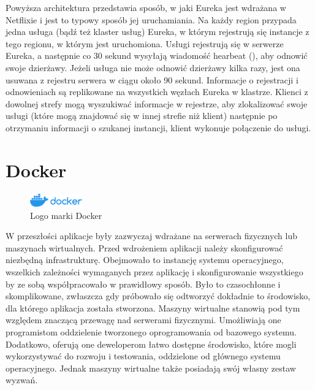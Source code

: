 Powyższa architektura przedstawia sposób, w jaki Eureka jest wdrażana w Netflixie i jest to typowy sposób jej uruchamiania. Na każdy region przypada jedna usługa (bądź też klaster usług) Eureka, w którym rejestrują się instancje z tego regionu, w którym jest uruchomiona. Usługi rejestrują się w serwerze Eureka, a następnie co 30 sekund wysyłają wiadomość hearbeat (), aby odnowić swoje dzierżawy. Jeżeli usługa nie może odnowić dzierżawy kilka razy, jest ona usuwana z rejestru serwera w ciągu około 90 sekund. Informacje o rejestracji i odnowieniach są replikowane na wszystkich węzłach Eureka w klastrze. Klienci z dowolnej strefy mogą wyszukiwać informacje w rejestrze, aby zlokalizować swoje usługi (które mogą znajdować się w innej strefie niż klient) następnie po otrzymaniu informacji o szukanej instancji, klient wykonuje połączenie do usługi\cite{netflixEurekaArticleWang}\cite{netflixEurekaGithub}\cite{springEureka}\cite{netflixEurekaManual}.

\section{Docker}

\begin{figure}[!htbp]
    \centering
    \includegraphics[width=0.2\textwidth]{images/Docker_logo.png}
    \caption{Logo marki Docker \cite{DockerMedia}}
    \label{fig:enter-label}
\end{figure}

W przeszłości aplikacje były zazwyczaj wdrażane na serwerach fizycznych lub maszynach wirtualnych. Przed wdrożeniem aplikacji należy skonfigurować niezbędną infrastrukturę. Obejmowało to instancję systemu operacyjnego, wszelkich zależności wymaganych przez aplikację i skonfigurowanie wszystkiego by ze sobą współpracowało w prawidłowy sposób. Było to czasochłonne i skomplikowane, zwłaszcza gdy próbowało się odtworzyć dokładnie to środowisko, dla którego aplikacja została stworzona.
Maszyny wirtualne stanowią pod tym względem znaczącą przewagę nad serwerami fizycznymi. Umożliwiają one programistom oddzielenie tworzonego oprogramowania od bazowego systemu. Dodatkowo, oferują one deweloperom łatwo dostępne środowisko, które mogli wykorzystywać do rozwoju i testowania, oddzielone od głównego systemu operacyjnego. Jednak maszyny wirtualne także posiadają swój własny zestaw wyzwań\cite{dockerContenerizationKeyAndUseCases}. 

